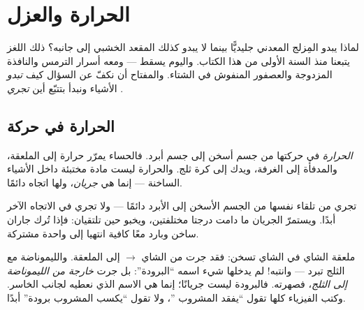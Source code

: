 \chapter{الحرارة والعزل}\label{ch:g5:heat-and-insulation}

لماذا يبدو المِزلج المعدني جليديًّا بينما لا يبدو كذلك المقعد
الخشبي إلى جانبه؟ ذلك اللغز يتبعنا منذ السنة الأولى من هذا
الكتاب. واليوم يسقط --- ومعه أسرار الترمس والنافذة المزدوجة
والعصفور المنفوش في الشتاء. والمفتاح أن نكفّ عن السؤال كيف
\emph{تبدو} الأشياء ونبدأ بتتبّع أين \emph{تجري} .

\section{الحرارة في حركة}

\begin{definition}[الحرارة]\label{def:g5:heat-and-insulation:heat}
\emph{الحرارة}  في حركتها من جسم أسخن إلى جسم
أبرد. فالحساء يمرّر حرارة إلى الملعقة، والمدفأة إلى الغرفة، ويدك
إلى كرة ثلج. والحرارة ليست مادة مختبئة داخل الأشياء الساخنة ---
إنما هي \emph{جريان}، ولها اتجاه دائمًا.
\end{definition}

\begin{proposition}\label{prop:g5:heat-and-insulation:downhill}
تجري  من تلقاء نفسها من الجسم الأسخن إلى الأبرد دائمًا
--- ولا تجري في الاتجاه الآخر أبدًا. ويستمرّ الجريان ما دامت
درجتا  مختلفتين، ويخبو حين تلتقيان: فإذا تُرك جاران
ساخن وبارد معًا  كافية انتهيا إلى  واحدة مشتركة.
\end{proposition}

\begin{example}\label{ex:g5:heat-and-insulation:direction}
ملعقة الشاي في الشاي تسخن: فقد جرت  من الشاي $\to$ إلى
الملعقة. والليموناضة مع الثلج تبرد --- وانتبه! لم يدخلها شيء
اسمه ``البرودة'': بل جرت  \emph{خارجة من الليموناضة إلى
الثلج}، فصهرته. فالبرودة ليست جريانًا؛ إنما هي الاسم الذي نعطيه
لجانب الخاسر. وكتب الفيزياء كلها تقول ``يفقد المشروب ''،
ولا تقول ``يكسب المشروب برودة'' أبدًا.
\end{example}


